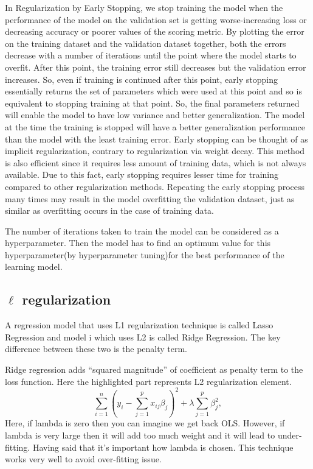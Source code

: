 In Regularization by Early Stopping, we stop training the model when the performance of the 
model on the validation set is getting worse-increasing loss or decreasing accuracy or poorer 
values of the scoring metric. By plotting the error on the training dataset and the validation 
dataset together, both the errors decrease with a number of iterations until the point where 
the model starts to overfit.
After this point, the training error still decreases but the validation error increases. 
So, even if training is continued after this point, early stopping essentially returns the set of
parameters which were used at this point and so is equivalent to stopping training at that point.
So, the final parameters returned will enable the model to have low variance and 
better generalization. 
The model at the time the training is stopped will have a better generalization performance than
the model with the least training error. 
Early stopping can be thought of as implicit regularization, contrary to regularization via 
weight decay. 
This method is also efficient since it requires less amount of training data,
which is not always available. Due to this fact, early stopping requires lesser time for training 
compared to other regularization methods. 
Repeating the early stopping process many times may result in the model overfitting the
validation dataset, just as similar as overfitting occurs in the case of training data.

The number of iterations taken to train the model can be considered as a hyperparameter.
Then the model has to find an optimum value for this hyperparameter(by hyperparameter 
tuning)for the best performance of the learning model.


\subsection{$\ell$ regularization}
\FloatBarrier
A regression model that uses L1 regularization technique is called Lasso Regression and model i
which uses L2 is called Ridge Regression.
The key difference between these two is the penalty term.

Ridge regression adds ``squared magnitude'' of coefficient as penalty term to the loss function.
Here the highlighted part represents L2 regularization element.
\begin{equation}
	\label{equ:ridge_regression}
	\sum_{i=1}^{n}(y_{i}-\sum_{j=1}^{p}x_{ij}\beta_{j})^{2} + \lambda \sum_{j=1}^{p}\beta_{j}^{2},
\end{equation}
Here, if lambda is zero then you can imagine we get back OLS.
However, if lambda is very large then it will add too much weight and it will lead to
under-fitting. Having said that it’s important how lambda is chosen.
This technique works very well to avoid over-fitting issue.

